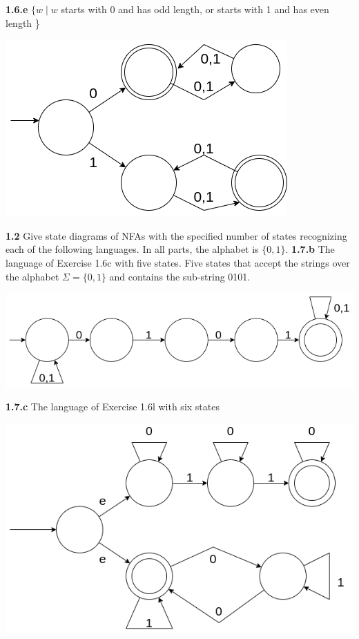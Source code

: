 \documentclass[11pt]{article}
\begin{document}
\textbf{1.6.e} 
\newline
$ \{ w \mid w$ starts with $0$ and has odd length, or starts with 1 and has even length \}
\begin{center}
\includegraphics[scale=0.5]{02/HW02-1.6.e.png}    
\end{center}
\newpage
\noindent
\textbf{1.2} Give state diagrams of NFAs with the specified number of states recognizing each of the following languages. In all parts, the alphabet is $\{0,1\}$.
\newline
\newline
\textbf{1.7.b} 
The language of Exercise 1.6c with five states.
\newline
\newline
Five states that accept the strings over the alphabet $\Sigma=\{0,1\}$ and contains the sub-string 0101.
\begin{center}
\includegraphics[scale=0.5]{02/HW02-1.7.b.png}    
\end{center}
\noindent
\textbf{1.7.c}
The language of Exercise 1.6l with six states
\begin{center}
\includegraphics[scale=0.5]{02/HW02-1.7.c.png}    
\end{center}
\end{document}
